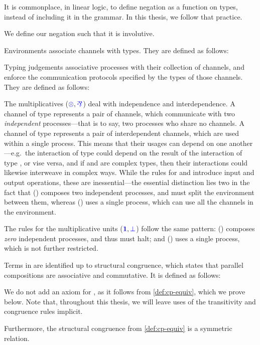 It is commonplace, in linear logic, to define negation as a function on types,
instead of including it in the grammar.
In this thesis, we follow that practice.

We define our negation such that it is involutive.

Environments associate channels with types. They are defined as follows:

Typing judgements associative processes with their collection of channels, and
enforce the communication protocols specified by the types of those channels.
They are defined as follows:


The multiplicatives ($\ty{\tens}, \ty{\parr}$) deal with independence and
interdependence. A channel of type  represents a pair of channels,
which communicate with two \emph{independent} processes---that is to say, two
processes who share no channels. A channel of type  represents a
pair of interdependent channels, which are used within a single process. This
means that their usages can depend on one another---e.g.\ the interaction of
type  could depend on the result of the interaction of type , or
vise versa, and if  and  are complex types, then their interactions
could likewise interweave in complex ways.
While the rules for \ty{\tens} and \ty{\parr} introduce input and output
operations, these are inessential---the essential distinction lies two in the
fact that (\tens) composes two independent processes, and must split the
environment between them, whereas (\parr) uses a single process, which can use
all the channels in the environment.

The rules for the multiplicative units ($\textcolor{blue}{\mathbf{1}}, \textcolor{blue}{\bot}$) follow the same
pattern: (\one) composes \emph{zero} independent processes, and thus must halt;
and (\bot) uses a single process, which is not further restricted.

Terms in \rcp are identified up to structural congruence, which states that parallel compositions  are associative and commutative.
It is defined as follows:

We do not add an axiom for , as it follows from \cref{def:cp-equiv}, which we prove below.
Note that, throughout this thesis, we will leave uses of the transitivity and congruence rules implicit.

Furthermore, the structural congruence from \cref{def:cp-equiv} is a symmetric
relation.

















